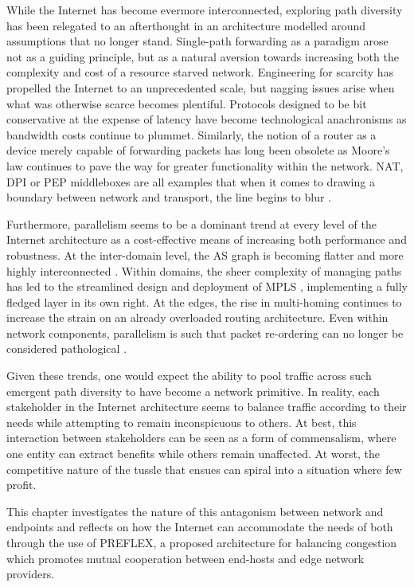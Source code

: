 While the Internet has become evermore interconnected, exploring path diversity has been relegated to an afterthought in an architecture modelled around assumptions that no longer stand. 
Single-path forwarding as a paradigm arose not as a guiding principle, but as a natural aversion towards increasing both the complexity and cost of a resource starved network.
Engineering for scarcity has propelled the Internet to an unprecedented scale, but nagging issues arise when what was otherwise scarce becomes plentiful. 
Protocols designed to be bit conservative at the expense of latency have become technological anachronisms as bandwidth costs continue to plummet. 
Similarly, the notion of a router as a device merely capable of forwarding packets has long been obsolete as Moore's law continues to pave the way for greater functionality within the network. 
\ac{NAT}, \ac{DPI} or \ac{PEP} middleboxes are all examples that when it comes to drawing a boundary between network and transport, the line begins to blur \cite{Ford:2008p34}.

Furthermore, parallelism seems to be a dominant trend at every level of the Internet architecture as a cost-effective means of increasing both performance and robustness. 
At the inter-domain level, the \ac{AS} graph is becoming flatter and more highly interconnected \cite{Haddadi:2010p129}. 
Within domains, the sheer complexity of managing paths has led to the streamlined design and deployment of \ac{MPLS} \cite{Rosen:2001p147}, implementing a fully fledged layer in its own right. 
At the edges, the rise in multi-homing continues to increase the strain on an already overloaded routing architecture. 
Even within network components, parallelism is such that packet re-ordering can no longer be considered pathological \cite{Bennett:1999p120}.

Given these trends, one would expect the ability to pool traffic across such emergent path diversity to have become a network primitive. 
In reality, each stakeholder in the Internet architecture seems to balance traffic according to their needs while attempting to remain inconspicuous to others. 
At best, this interaction between stakeholders can be seen as a form of commensalism, where one entity can extract benefits while others remain unaffected. 
At worst, the competitive nature of the tussle \cite{Clark:2005p67} that ensues can spiral into a situation where few profit.

This chapter investigates the nature of this antagonism between network and endpoints and reflects on how the Internet can accommodate the needs of both through the use of \ac{PREFLEX}, a proposed architecture for balancing congestion which promotes mutual cooperation between end-hosts and edge network providers.
